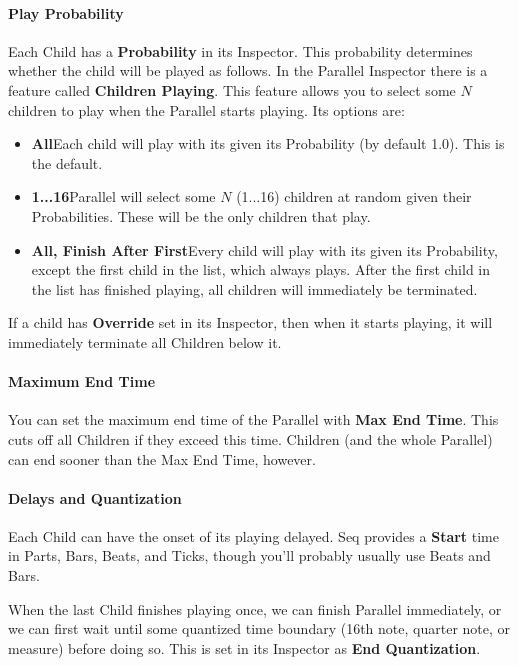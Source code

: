 \documentclass[twoside,10pt]{article}
\begin{document}
\paragraph{Play Probability}

Each Child has a {\bf Probability} in its Inspector.  This probability determines whether the child will be played as follows.  In the Parallel Inspector there is a feature called {\bf Children Playing}.  This feature allows you to select some \(N\) children to play when the Parallel starts playing.  Its options are:

\begin{itemize}
\item {\bf All}\quad Each child will play with its given its Probability (by default 1.0).  This is the default.
\item {\bf 1...16}\quad Parallel will select some \(N\) (1...16) children at random given their Probabilities.  These will be the only children that play.
\item {\bf All, Finish After First}\quad Every child will play with its given its Probability, except the first child in the list, which always plays.  After the first child in the list has finished playing, all children will immediately be terminated.
\end{itemize}

If a child has {\bf Override} set in its Inspector, then when it starts playing, it will immediately terminate all Children below it.  

\paragraph{Maximum End Time}

You can set the maximum end time of the Parallel with {\bf Max End Time}.  This cuts off all Children if they exceed this time.  Children (and the whole Parallel) can end sooner than the Max End Time, however.

\paragraph{Delays and Quantization}

Each Child can have the onset of its playing delayed.  Seq provides a {\bf Start} time in Parts, Bars, Beats, and Ticks, though you'll probably usually use Beats and Bars.

When the last Child finishes playing once, we can finish Parallel immediately, or we can first wait until some quantized time boundary (16th note, quarter note, or measure) before doing so.  This is set in its Inspector as {\bf End Quantization}.
\end{document}
